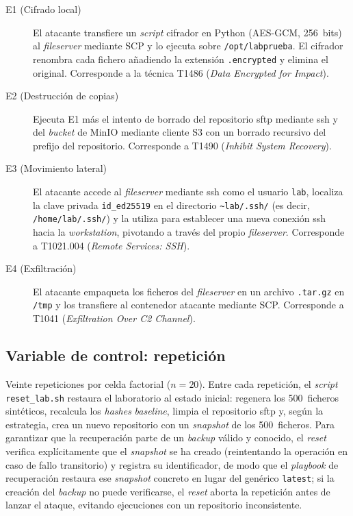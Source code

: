 \documentclass[../main.tex]{subfiles}
\begin{document}
\begin{description}
  \item[E1 (Cifrado local)] El atacante transfiere un \emph{script} cifrador en
  Python (AES-GCM, 256~bits) al \emph{fileserver} mediante SCP y lo ejecuta
  sobre \texttt{/opt/labprueba}. El cifrador renombra cada fichero añadiendo la
  extensión \texttt{.encrypted} y elimina el original. Corresponde a la técnica
  T1486 (\emph{Data Encrypted for Impact}).

  \item[E2 (Destrucción de copias)] Ejecuta E1 más el intento de borrado del
  repositorio \gls{sftp} mediante \gls{ssh} y del \emph{bucket} de MinIO mediante
  cliente S3 con un borrado recursivo del prefijo del repositorio. Corresponde a
  T1490 (\emph{Inhibit System Recovery}).

  \item[E3 (Movimiento lateral)] El atacante accede al \emph{fileserver} mediante
  \gls{ssh} como el usuario \texttt{lab}, localiza la clave privada
  \texttt{id\_ed25519} en el directorio \texttt{\textasciitilde{}lab/.ssh/}
  (es decir, \texttt{/home/lab/.ssh/}) y la utiliza para establecer una nueva
  conexión \gls{ssh} hacia la \emph{workstation}, pivotando a través del propio
  \emph{fileserver}. Corresponde a T1021.004 (\emph{Remote Services: SSH}).

  \item[E4 (Exfiltración)] El atacante empaqueta los ficheros del \emph{fileserver}
  en un archivo \texttt{.tar.gz} en \texttt{/tmp} y los transfiere al contenedor
  atacante mediante SCP. Corresponde a T1041 (\emph{Exfiltration Over C2
  Channel}).
\end{description}

\subsection{Variable de control: repetición}

Veinte repeticiones por celda factorial ($n = 20$). Entre cada repetición, el
\emph{script} \texttt{reset\_lab.sh} restaura el laboratorio al estado inicial:
regenera los 500~ficheros sintéticos, recalcula los \emph{hashes} \emph{baseline},
limpia el repositorio \gls{sftp} y, según la estrategia, crea un nuevo repositorio
\restic con un \emph{snapshot} de los 500~ficheros. Para garantizar que la
recuperación parte de un \emph{backup} válido y conocido, el \emph{reset} verifica
explícitamente que el \emph{snapshot} se ha creado (reintentando la operación en
caso de fallo transitorio) y registra su identificador, de modo que el
\emph{playbook} de recuperación restaura ese \emph{snapshot} concreto en lugar del
genérico \texttt{latest}; si la creación del \emph{backup} no puede verificarse, el
\emph{reset} aborta la repetición antes de lanzar el ataque, evitando ejecuciones
con un repositorio inconsistente.
\end{document}
